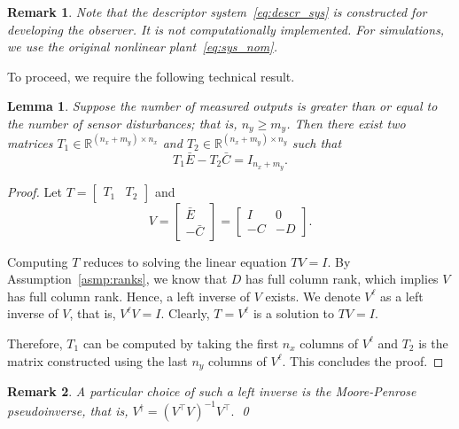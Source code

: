 \documentclass[times, doublespace]{rncauth}
\newtheorem{lemma}{Lemma}
\newtheorem{remark}{Remark}
\begin{document}
\begin{remark}
Note that the descriptor system~\eqref{eq:descr_sys} is constructed for developing the observer. It is not computationally implemented. For simulations, we use the original nonlinear plant~\eqref{eq:sys_nom}.
\end{remark}
To proceed, we require the following technical result.
\begin{lemma}\label{prop:T1_T2}
	Suppose the number of measured outputs is greater than or equal to the number of sensor disturbances; that is, $n_y \ge m_y$. Then there exist two matrices $T_1\in\mathbb{R}^{(n_x+m_y)\times n_x}$ and $T_2\in\mathbb{R}^{(n_x+m_y)\times n_y}$ such that
	\begin{equation}\label{eq:T1_T2}
	T_1\bar E - T_2 \bar C = I_{n_x+m_y}.
	\end{equation}
\end{lemma}
\begin{proof}
	Let $T = \begin{bmatrix}
	T_1 & T_2
	\end{bmatrix}$ and $$V = \begin{bmatrix}
	\bar E \\ -\bar C
	\end{bmatrix}=\begin{bmatrix}
	I & 0 \\ -C & -D
	\end{bmatrix}.$$ 
	
	Computing $T$ reduces to solving the linear equation $TV = I$. By Assumption~\ref{asmp:ranks}, we know that $D$ has full column rank, which implies $V$ has full column rank. Hence, a left inverse of $V$ exists. We denote $V^\ell$ as a left inverse of $V$, that is, $V^\ell V=I$. Clearly, $T = V^\ell$ is a solution to $TV = I$.
	
	Therefore, $T_1$ can be computed by taking the first $n_x$ columns of $V^\ell$ and $T_2$ is the matrix constructed using the last $n_y$ columns of $V^\ell$. This concludes the proof.
\end{proof}

\begin{remark}
	A particular choice of such a left inverse is the Moore-Penrose pseudoinverse, that is, $V^\dagger=(V^\top V)^{-1}V^\top.$
	\qed	\end{remark}
\end{document}
